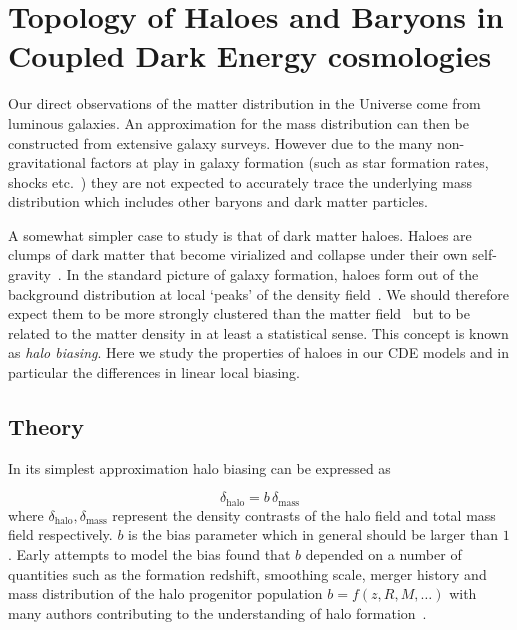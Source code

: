 \chapter{Topology of Haloes and Baryons in Coupled Dark Energy cosmologies}
\label{chapter5}

Our direct observations of the matter distribution in the Universe come from luminous galaxies. An approximation for the mass distribution can then be constructed from extensive galaxy surveys. However due to the many non-gravitational factors at play in galaxy formation (such as star formation rates, shocks etc.~\citealt{2010gfe..book.....M}) they are not expected to accurately trace the underlying mass distribution which includes other baryons and dark matter particles. 

A somewhat simpler case to study is that of dark matter haloes. Haloes are clumps of dark matter that become virialized and collapse under their own self-gravity~\citep{Mo1995}. In the standard picture of galaxy formation, haloes form out of the background distribution at local `peaks' of the density field~\citep{Sheth1999a}. We should therefore expect them to be more strongly clustered than the matter field~\citep{Taruya2000} but to be related to the matter density in at least a statistical sense. This concept is known as \textit{halo biasing}. Here we study the properties of haloes in our CDE models and in particular the differences in linear local biasing.




\section{Theory}

In its simplest approximation halo biasing can be expressed as

\begin{equation}
\delta_{\mathrm{halo}} = b \, \delta_{\mathrm{mass}}
\end{equation}
where $\delta_{\mathrm{halo}}, \delta_{\mathrm{mass}}$ represent the density contrasts of the halo field and total mass field respectively. $b$ is the bias parameter which in general should be larger than $1$. Early attempts to model the bias found that $b$ depended on a number of quantities such as the formation redshift, smoothing scale, merger history and mass distribution of the halo progenitor population $b = f(z,R,M,\ldots)$ with many authors contributing to the understanding of halo formation~\citep{Press1974,Bond1991,Lacey1994}. 

